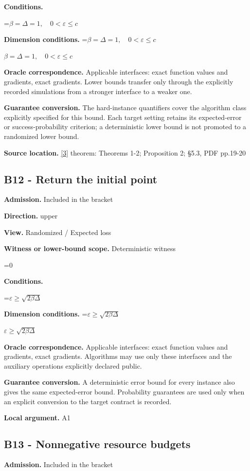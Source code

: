 \documentclass[10pt,a4paper]{article}
\newcommand{\AtlasMath}[1]{\par\begingroup\centering\setbox0=\hbox{$\displaystyle #1$}\ifdim\wd0>1.4\linewidth\typeout{ATLAS WIDE FORMULA: \the\wd0}\fi\ifdim\wd0>\linewidth\resizebox{\linewidth}{!}{\box0}\else\box0\fi\par\endgroup}
\newcommand{\AtlasInlineMath}[1]{\begingroup\setbox0=\hbox{$#1$}\ifdim\wd0>.4\linewidth\endgroup\AtlasMath{#1}\else\endgroup$#1$\fi}
\begin{document}
\textbf{Conditions.} 
\AtlasMath{\beta=\Delta=1,\quad0<\varepsilon\le c}


\textbf{Dimension conditions.} \AtlasInlineMath{\beta=\Delta=1,\quad0<\varepsilon\le c}

\textbf{Oracle correspondence.} Applicable interfaces: exact function values and gradients, exact gradients. Lower bounds transfer only through the explicitly recorded simulations from a stronger interface to a weaker one.

\textbf{Guarantee conversion.} The hard-instance quantifiers cover the algorithm class explicitly specified for this bound. Each target setting retains its expected-error or success-probability criterion; a deterministic lower bound is not promoted to a randomized lower bound.

\textbf{Source location.} \href{https://arxiv.org/pdf/1710.11606}{[3]} theorem: Theorems 1-2; Proposition 2; §5.3, PDF pp.19-20

\subsection{B12 - Return the initial point}
\textbf{Admission.} Included in the bracket

\textbf{Direction.} upper

\textbf{View.} Randomized / Expected loss

\textbf{Witness or lower-bound scope.} Deterministic witness

\AtlasMath{0}
\textbf{Conditions.} 
\AtlasMath{\varepsilon\ge\sqrt{2\beta\Delta}}


\textbf{Dimension conditions.} \AtlasInlineMath{\varepsilon\ge\sqrt{2\beta\Delta}}

\textbf{Oracle correspondence.} Applicable interfaces: exact function values and gradients, exact gradients. Algorithms may use only these interfaces and the auxiliary operations explicitly declared public.

\textbf{Guarantee conversion.} A deterministic error bound for every instance also gives the same expected-error bound. Probability guarantees are used only when an explicit conversion to the target contract is recorded.

\textbf{Local argument.} A1

\subsection{B13 - Nonnegative resource budgets}
\textbf{Admission.} Included in the bracket
\end{document}
